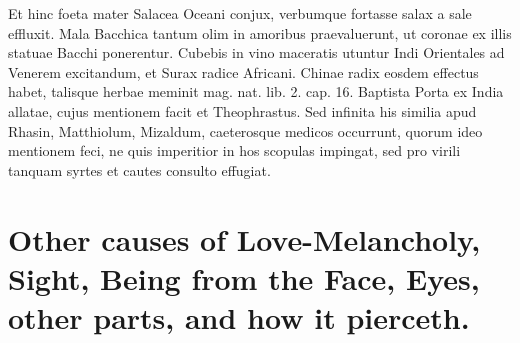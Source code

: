 Et hinc foeta mater Salacea Oceani conjux, verbumque fortasse salax a
sale effluxit. Mala Bacchica tantum olim in amoribus praevaluerunt, ut
coronae ex illis statuae Bacchi ponerentur. Cubebis in vino
maceratis utuntur Indi Orientales ad Venerem excitandum, et Surax
radice Africani. Chinae radix eosdem effectus habet, talisque herbae
meminit mag. nat. lib. 2. cap. 16. Baptista Porta ex India
allatae, cujus mentionem facit et Theophrastus. Sed infinita his
similia apud Rhasin, Matthiolum, Mizaldum, caeterosque medicos
occurrunt, quorum ideo mentionem feci, ne quis imperitior in hos
scopulas impingat, sed pro virili tanquam syrtes et cautes consulto
effugiat.

\section[Other causes of Love-Melancholy]{Other causes of Love-Melancholy, Sight, Being from the Face, Eyes, other parts, and how it pierceth.}


